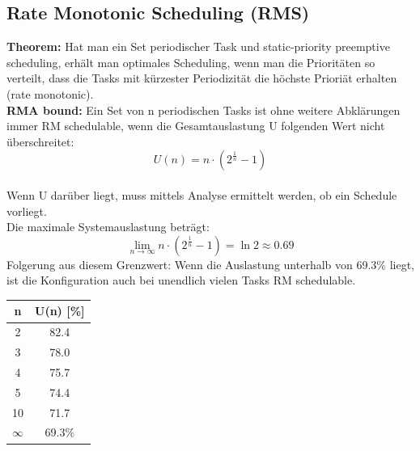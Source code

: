 \subsection{Rate Monotonic Scheduling (RMS)}
\begin{minipage}{0.8\linewidth}
  \textbf{Theorem:}
  Hat man ein Set periodischer Task und static-priority preemptive scheduling, erhält man optimales Scheduling, wenn man die Prioritäten so verteilt, dass die Tasks mit kürzester Periodizität die höchste Prioriät erhalten (rate monotonic).\\
  \textbf{RMA bound:}
  Ein Set von n periodischen Tasks ist ohne weitere Abklärungen immer RM schedulable, wenn die Gesamtauslastung U folgenden Wert nicht überschreitet:
  \begin{equation}
    U(n) = n\cdot (2^{\frac{1}{n}}-1)
  \end{equation}\\
  Wenn U darüber liegt, muss mittels Analyse ermittelt werden, ob ein Schedule vorliegt.\\

  Die maximale Systemauslastung beträgt:
  \begin{equation}
    \lim_{n \to \infty}n\cdot(2^\frac{1}{n}-1) = \ln 2 \approx 0.69
  \end{equation}
  Folgerung aus diesem Grenzwert: Wenn die Auslastung unterhalb von 69.3\% liegt, ist die Konfiguration auch bei unendlich vielen Tasks RM schedulable.
\end{minipage}
\begin{minipage}{0.2\linewidth}
  \centering
  \begin{tabular}{| c | c |}
    \hline
    n        & U(n) [\%] \\
    \hline
    2        & 82.4      \\
    3        & 78.0      \\
    4        & 75.7      \\
    5        & 74.4      \\
    10       & 71.7      \\
    $\infty$ & 69.3\%    \\
    \hline
  \end{tabular}
\end{minipage}

